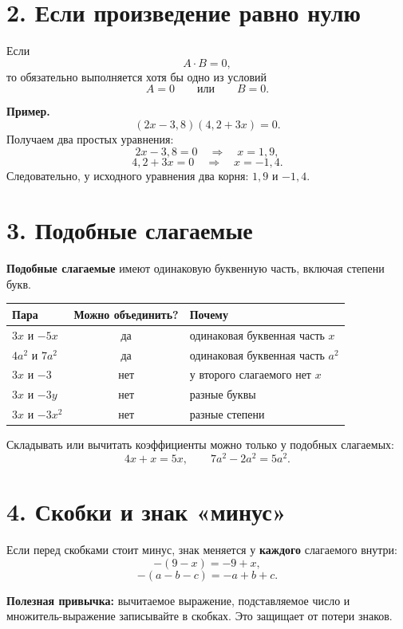 \documentclass[a4paper,12pt]{article}
\newcommand{\sectionline}{\par\vspace{0.1em}{\color{accent}\hrule height 0.6pt}\vspace{0.45em}}
\newcommand{\key}[1]{\textbf{\color{darkaccent}#1}}
\begin{document}
\section*{2. Если произведение равно нулю}
\sectionline

Если
\[
  A\cdot B=0,
\]
то обязательно выполняется хотя бы одно из условий
\[
  A=0 \qquad \text{или} \qquad B=0.
\]

\textbf{Пример.}
\[
  (2x-3{,}8)(4{,}2+3x)=0.
\]
Получаем два простых уравнения:
\[
  2x-3{,}8=0 \quad\Rightarrow\quad x=1{,}9,
\]
\[
  4{,}2+3x=0 \quad\Rightarrow\quad x=-1{,}4.
\]
Следовательно, у исходного уравнения два корня: $1{,}9$ и $-1{,}4$.

\section*{3. Подобные слагаемые}
\sectionline

\key{Подобные слагаемые} имеют одинаковую буквенную часть, включая степени букв.

\begin{center}
\renewcommand{\arraystretch}{1.3}
\begin{tabularx}{0.94\linewidth}{@{}X c X@{}}
\toprule
Пара & Можно объединить? & Почему \\
\midrule
$3x$ и $-5x$ & да & одинаковая буквенная часть $x$ \\
$4a^2$ и $7a^2$ & да & одинаковая буквенная часть $a^2$ \\
$3x$ и $-3$ & нет & у второго слагаемого нет $x$ \\
$3x$ и $-3y$ & нет & разные буквы \\
$3x$ и $-3x^2$ & нет & разные степени \\
\bottomrule
\end{tabularx}
\end{center}

Складывать или вычитать коэффициенты можно только у подобных слагаемых:
\[
  4x+x=5x, \qquad 7a^2-2a^2=5a^2.
\]

\section*{4. Скобки и знак «минус»}
\sectionline

Если перед скобками стоит минус, знак меняется у \key{каждого} слагаемого внутри:
\[
  -(9-x)=-9+x,
\]
\[
  -(a-b-c)=-a+b+c.
\]

\textbf{Полезная привычка:} вычитаемое выражение, подставляемое число и множитель-выражение записывайте в скобках. Это защищает от потери знаков.
\end{document}
